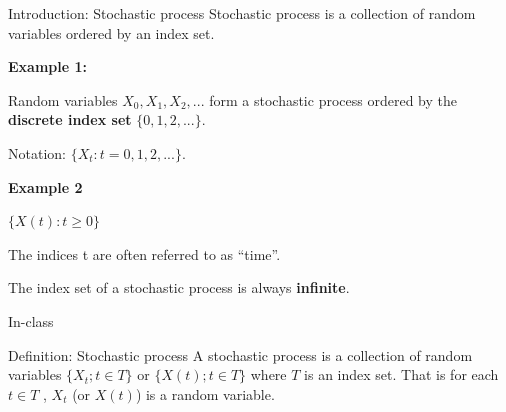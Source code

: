 \documentclass[12pt,ignorenonframetext,]{beamer}
\begin{document}

\begin{frame}{Introduction: Stochastic process}
\protect\hypertarget{introduction-stochastic-process}{}
Stochastic process is a collection of random variables ordered by an
index set.

\textbf{Example 1:}

Random variables \(X_0, X_1, X_2, ...\) form a stochastic process
ordered by the \textbf{discrete index set} \(\{0, 1, 2,...\}\).

Notation: \(\{X_t: t=0, 1, 2, ...\}\).

\textbf{Example 2}

\(\{X(t): t \geq 0\}\)

The indices t are often referred to as ``time''.

The index set of a stochastic process is always \textbf{infinite}.
\end{frame}

\begin{frame}{In-class}
\protect\hypertarget{in-class}{}
\end{frame}

\begin{frame}{Definition: Stochastic process}
\protect\hypertarget{definition-stochastic-process}{}
A stochastic process is a collection of random variables
\(\{X_t; t\in T\}\) or \(\{X(t); t\in T\}\) where \(T\) is an index set.
That is for each \(t \in T\) , \(X_t\) (or \(X(t)\)) is a random
variable.
\end{frame}
\end{document}
